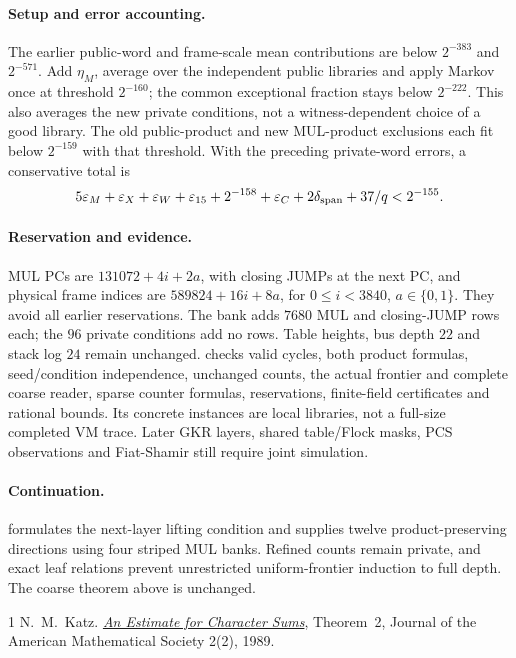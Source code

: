 \documentclass[11pt]{article}
\begin{document}
\paragraph{Setup and error accounting.} The earlier public-word and frame-scale mean contributions are below $2^{-383}$ and $2^{-571}$. Add $\eta_M$, average over the independent public libraries and apply Markov once at threshold $2^{-160}$; the common exceptional fraction stays below $2^{-222}$. This also averages the new private conditions, not a witness-dependent choice of a good library. The old public-product and new MUL-product exclusions each fit below $2^{-159}$ with that threshold. With the preceding private-word errors, a conservative total is
\[
 5\varepsilon_M+\varepsilon_X+\varepsilon_W+\varepsilon_{15}
 +2^{-158}+\varepsilon_C+2\delta_{\rm span}+37/q<2^{-155}.
\]

\paragraph{Reservation and evidence.} MUL PCs are $131072+4i+2a$, with closing JUMPs at the next PC, and physical frame indices are $589824+16i+8a$, for $0\le i<3840$, $a\in\{0,1\}$. They avoid all earlier reservations. The bank adds $7680$ MUL and closing-JUMP rows each; the $96$ private conditions add no rows. Table heights, bus depth $22$ and stack log $24$ remain unchanged.  checks valid cycles, both product formulas, seed/condition independence, unchanged counts, the actual frontier and complete coarse reader, sparse counter formulas, reservations, finite-field certificates and rational bounds. Its concrete instances are local libraries, not a full-size completed VM trace. Later GKR layers, shared table/Flock masks, PCS observations and Fiat-Shamir still require joint simulation.

\paragraph{Continuation.}  formulates the next-layer lifting condition and supplies twelve product-preserving directions using four striped MUL banks. Refined counts remain private, and exact leaf relations prevent unrestricted uniform-frontier induction to full depth. The coarse theorem above is unchanged.

\begin{thebibliography}{1}
 N.~M.~Katz. \href{https://web.math.princeton.edu/~nmk/old/estcharsums.pdf}{\emph{An Estimate for Character Sums}}, Theorem~2, Journal of the American Mathematical Society 2(2), 1989.
\end{thebibliography}
\end{document}
